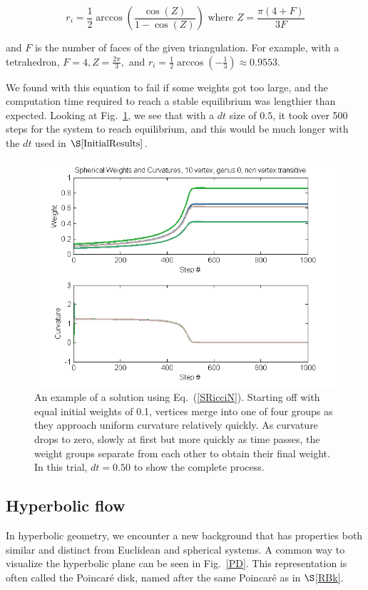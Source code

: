 \documentclass[12pt]{article}
\begin{document}
$$r_i = \frac{1}{2}\arccos(\frac{\cos(Z)}{1 - \cos(Z)}) \mbox{ where } Z = \frac{\pi(4 + F)}{3F}$$

 and $F$ is the number of faces of the given triangulation. For example, with a tetrahedron, $F = 4, Z = \frac{2\pi}{3},$ and $r_i = \frac{1}{2}\arccos(-\frac{1}{3}) \approx 0.9553.$ 

 We found with this equation to fail if some weights got too large, and the computation time required to reach a stable equilibrium was lengthier than expected. Looking at Fig.~\ref{SphGood}, we see that with a $dt$ size of $0.5$, it took over 500 steps for the system to reach equilibrium, and this would be much longer with the $dt$ used in $\S\ref{InitialResults}$.  

\begin{figure}[ht]
\centering
\includegraphics[scale = 0.8]{Pictures3/SphG0V10.png}
\caption{An example of a solution using Eq.~(\ref{SRicciN}). Starting off with equal initial weights of 0.1, vertices merge into one of four groups as they approach uniform curvature relatively quickly. As curvature drops to zero, slowly at first but more quickly as time passes, the weight groups separate from each other to obtain their final weight. In this trial, $dt = 0.50$ to show the complete process.}
\label{SphGood}  
\end{figure}

\subsection{Hyperbolic flow}

In hyperbolic geometry, we encounter a new background that has properties both similar and distinct from Euclidean and spherical systems. A common way to visualize the hyperbolic plane can be seen in Fig.~\ref{PD}. This representation is often called the Poincar\'{e} disk, named after the same Poincar\'{e} as in $\S$\ref{RBk}.
\end{document}
